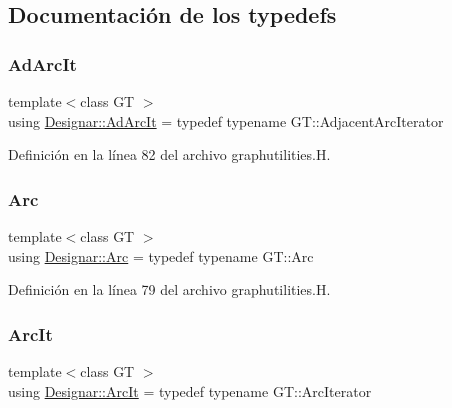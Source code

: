 \subsection{Documentación de los \textquotesingle{}typedefs\textquotesingle{}}
\mbox{\label{namespace_designar_a88b020661576bc09a536766283ec1790}} 
\subsubsection{\texorpdfstring{Ad\+Arc\+It}{AdArcIt}}
{\footnotesize\ttfamily template$<$class GT $>$ \\
using \hyperlink{namespace_designar_a88b020661576bc09a536766283ec1790}{Designar\+::\+Ad\+Arc\+It} = typedef typename G\+T\+::\+Adjacent\+Arc\+Iterator}



Definición en la línea 82 del archivo graphutilities.\+H.

\mbox{\label{namespace_designar_a3f55fb5513d62ff47cbc8f72b8e95d6f}} 
\subsubsection{\texorpdfstring{Arc}{Arc}}
{\footnotesize\ttfamily template$<$class GT $>$ \\
using \hyperlink{namespace_designar_a3f55fb5513d62ff47cbc8f72b8e95d6f}{Designar\+::\+Arc} = typedef typename G\+T\+::\+Arc}



Definición en la línea 79 del archivo graphutilities.\+H.

\mbox{\label{namespace_designar_a30ebaaade3ffa312c33d6e1234a96952}} 
\subsubsection{\texorpdfstring{Arc\+It}{ArcIt}}
{\footnotesize\ttfamily template$<$class GT $>$ \\
using \hyperlink{namespace_designar_a30ebaaade3ffa312c33d6e1234a96952}{Designar\+::\+Arc\+It} = typedef typename G\+T\+::\+Arc\+Iterator}



